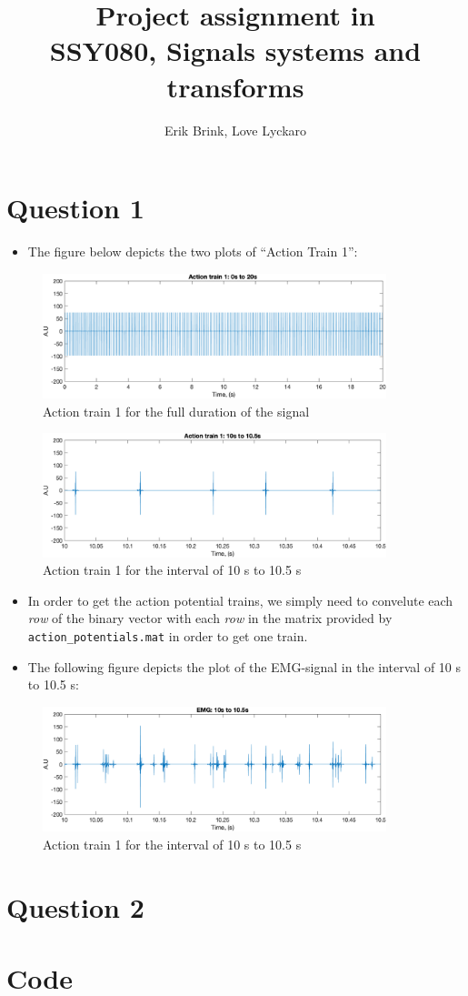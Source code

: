 \documentclass[a4paper, 12pt]{article}
\title{Project assignment in\\
       SSY080, Signals systems and transforms}
\author{Erik Brink, Love Lyckaro}
\begin{document}
\maketitle
{}
\newpage
{}

\section*{Question 1}
  \begin{itemize}
    \item The figure below depicts the two plots of ``Action Train 1'':
  \end{itemize}
  \begin{figure}[H]
    \centering
    \includegraphics[width= 10cm]{at1_0to20.png}
    \caption{Action train 1 for the full duration of the signal}
  \end{figure}
  \begin{figure}[H]
    \centering
    \includegraphics[width= 10cm]{at1_10to105.png}
    \caption{Action train 1 for the interval of 10 s to 10.5 s}
  \end{figure}
  \begin{itemize}
    \item In order to get the action potential trains, we simply need to convelute each \textit{row} of the binary vector with each \textit{row} in the matrix provided by \lstinline{action_potentials.mat} in order to get one train.
    \item The following figure depicts the plot of the EMG-signal in the interval of 10 s to 10.5 s:
  \end{itemize}
  \begin{figure}[H]
    \centering
    \includegraphics[width= 10cm]{emg_10to105.png}
    \caption{Action train 1 for the interval of 10 s to 10.5 s}
  \end{figure}

\newpage
\section*{Question 2}
  
\newpage
{}
\section{Code}
    
\end{document}
